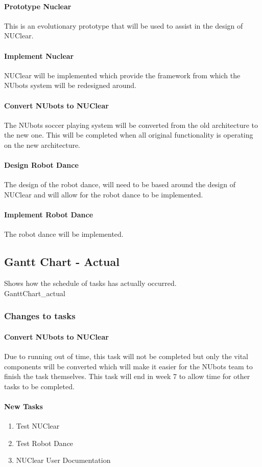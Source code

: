 \documentclass[a4paper]{article}
\begin{document}
				\paragraph{Prototype Nuclear}
					This is an evolutionary prototype that will be used to assist in the design of NUClear.
				\paragraph{Implement Nuclear}
					NUClear will be implemented which provide the framework from which the NUbots system will be redesigned around.
				\paragraph{Convert NUbots to NUClear}
					The NUbots soccer playing system will be converted from the old architecture to the new one. This will be completed when all original functionality is operating on the new architecture.
				\paragraph{Design Robot Dance}
					The design of the robot dance, will need to be based around the design of NUClear and will allow for the robot dance to be implemented.
				\paragraph{Implement Robot Dance}
					The robot dance will be implemented.
		\subsection{Gantt Chart - Actual}
			Shows how the schedule of tasks has actually occurred. \\
			{GanttChart_actual}
			\subsubsection{Changes to tasks}
				\paragraph{Convert NUbots to NUClear}
					Due to running out of time, this task will not be completed but only the vital components will be converted which will make it easier for the NUbots team to finish the task themselves. This task will end in week 7 to allow time for other tasks to be completed.
				\paragraph{New Tasks}
					\begin{enumerate}
						\item Test NUClear
						\item Test Robot Dance
						\item NUClear User Documentation
					\end{enumerate}
\end{document}

